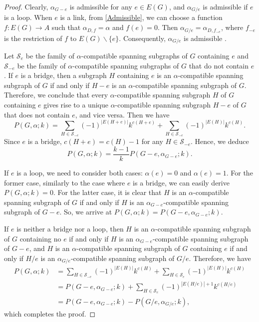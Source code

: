 \documentclass[12pt]{article}%
\numberwithin{equation}{section}
\begin{document}
\begin{proof}
Clearly, $\alpha_{G-e}$ is admissible for any $e\in E(G)$, and $\alpha_{G/e}$ is admissible if $e$ is a loop. When $e$ is a link, from \autoref{Admissible}, we can choose a function $f: E(G)\to A$ such that $\alpha_{D,f}=\alpha$ and $f(e)=0$. Then $\alpha_{G/e}=\alpha_{D,f_{-e}}$, where $f_{-e}$ is the restriction of $f$ to $E(G)\smallsetminus\{e\}$. Consequently, $\alpha_{G/e}$ is admissible .

Let $\mathcal{S}_{e}$ be the family of $\alpha$-compatible spanning subgraphs of $G$  containing $e$ and $\mathcal{S}_{-e}$ be the family of $\alpha$-compatible spanning subgraphs of $G$ that do not contain $e$. If $e$ is a bridge, then a subgraph $H$ containing $e$ is an $\alpha$-compatible spanning subgraph of $G$ if and only if $H-e$ is an $\alpha$-compatible spanning subgraph of $G$. Therefore, we conclude that every $\alpha$-compatible spanning subgraph $H$ of $G$ containing $e$ gives rise to a unique $\alpha$-compatible spanning subgraph $H-e$ of $G$ that does not contain $e$, and vice versa. Then we have
\[
P(G,\alpha;k)=\sum_{H\in\mathcal{S}_{-e}}(-1)^{|E(H+e)|}k^{c(H+e)}+\sum_{H\in\mathcal{S}_{-e}}(-1)^{|E(H)|}k^{c(H)}.
\]
Since $e$ is a bridge, $c(H+e)=c(H)-1$ for any $H\in\mathcal{S}_{-e}$. Hence, we deduce
\[
P(G,\alpha;k)=\frac{k-1}{k}P(G-e, \alpha_{G-e};k).
\]

If $e$ is a loop, we need to consider both cases: $\alpha(e)=0$ and $\alpha(e)=1$. For the former case, similarly to the case where $e$ is a bridge, we can easily derive $P(G,\alpha;k)=0$. For the latter case, it is clear that $H$ is an $\alpha$-compatible spanning subgraph of $G$ if and only if $H$ is an $\alpha_{G-e}$-compatible spanning subgraph of $G-e$. So, we arrive at $P(G,\alpha;k)=P(G-e, \alpha_{G-e};k)$.

If $e$ is neither a bridge nor a loop, then $H$ is an $\alpha$-compatible spanning subgraph of $G$ containing no $e$ if and only if $H$ is an $\alpha_{G-e}$-compatible spanning subgraph of $G-e$, and $H$ is an $\alpha$-compatible spanning subgraph of $G$ containing $e$ if and only if $H/e$ is an $\alpha_{G/e}$-compatible spanning subgraph of $G/e$. Therefore, we have
\begin{align*}
P(G,\alpha;k)&=\sum_{H\in\mathcal{S}_{-e}}(-1)^{|E(H)|}k^{c(H)}+\sum_{H\in\mathcal{S}_{e}}(-1)^{|E(H)|}k^{c(H)}\\
&=P(G-e, \alpha_{G-e};k)+\sum_{H\in\mathcal{S}_{e}}(-1)^{|E(H/e)|+1}k^{c(H/e)}\\
&=P(G-e, \alpha_{G-e};k)-P(G/e, \alpha_{G/e};k),
\end{align*}
which completes the proof.
\end{proof}
\end{document}
